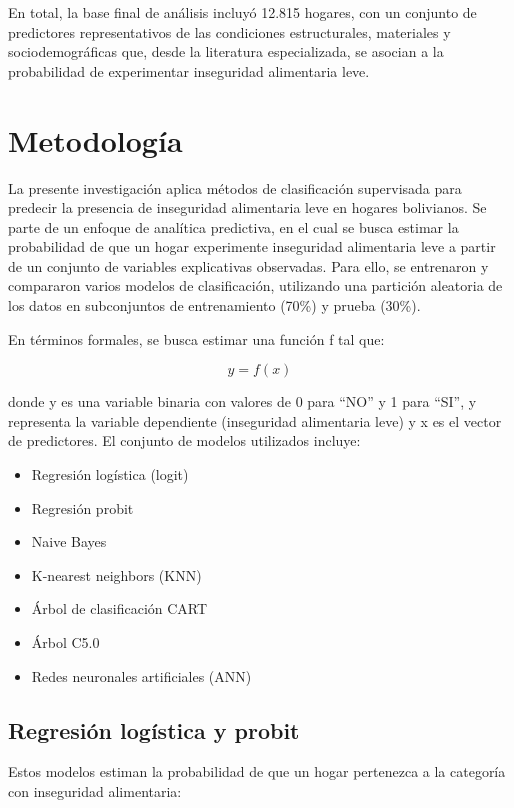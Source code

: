 \documentclass[Royal,times,sageh]{sagej}
\providecommand{\tightlist}{%
  \setlength{\itemsep}{0pt}\setlength{\parskip}{0pt}}
\begin{document}
En total, la base final de análisis incluyó 12.815 hogares, con un
conjunto de predictores representativos de las condiciones
estructurales, materiales y sociodemográficas que, desde la literatura
especializada, se asocian a la probabilidad de experimentar inseguridad
alimentaria leve.

\section{Metodología}\label{metodologuxeda}

La presente investigación aplica métodos de clasificación supervisada
para predecir la presencia de inseguridad alimentaria leve en hogares
bolivianos. Se parte de un enfoque de analítica predictiva, en el cual
se busca estimar la probabilidad de que un hogar experimente inseguridad
alimentaria leve a partir de un conjunto de variables explicativas
observadas. Para ello, se entrenaron y compararon varios modelos de
clasificación, utilizando una partición aleatoria de los datos en
subconjuntos de entrenamiento (70\%) y prueba (30\%).

En términos formales, se busca estimar una función f tal que:

\[ y = f(x) \]

donde y es una variable binaria con valores de 0 para ``NO'' y 1 para
``SI'', y representa la variable dependiente (inseguridad alimentaria
leve) y x es el vector de predictores. El conjunto de modelos utilizados
incluye:

\begin{itemize}
\tightlist
\item
  Regresión logística (logit)
\item
  Regresión probit
\item
  Naive Bayes
\item
  K-nearest neighbors (KNN)
\item
  Árbol de clasificación CART
\item
  Árbol C5.0
\item
  Redes neuronales artificiales (ANN)
\end{itemize}

\subsection{Regresión logística y
probit}\label{regresiuxf3n-loguxedstica-y-probit}

Estos modelos estiman la probabilidad de que un hogar pertenezca a la
categoría con inseguridad alimentaria:
\end{document}

